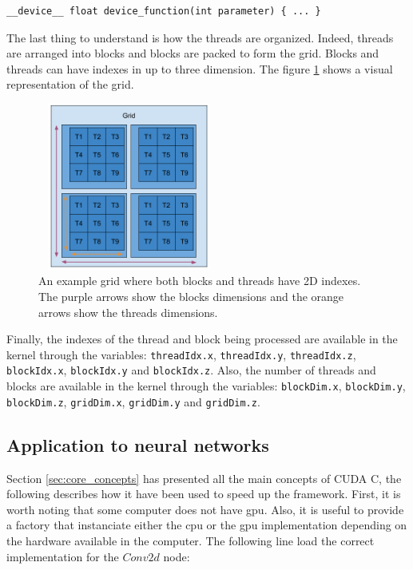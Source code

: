 \documentclass[11pt]{report}
\begin{document}
\begin{verbatim}
__device__ float device_function(int parameter) { ... }
\end{verbatim}

\noindent The last thing to understand is how the threads are organized. Indeed, threads are arranged into blocks and blocks are packed to form the grid. Blocks and threads can have indexes in up to three dimension. The figure \ref{fig:grid} shows a visual representation of the grid.
\\

\begin{figure}[h]
\centering
\includegraphics[width=6cm, height=5.5cm]{grid}
\caption[Illustration of the GPU grid]{An example grid where both blocks and threads have 2D indexes. The purple arrows show the blocks dimensions and the orange arrows show the threads dimensions.}
\label{fig:grid}
\end{figure}

\noindent Finally, the indexes of the thread and block being processed are available in the kernel through the variables: \texttt{threadIdx.x}, \texttt{threadIdx.y}, \texttt{threadIdx.z}, \texttt{blockIdx.x}, \texttt{blockIdx.y} and \texttt{blockIdx.z}. Also, the number of threads and blocks are available in the kernel through the variables: \texttt{blockDim.x}, \texttt{blockDim.y}, \texttt{blockDim.z}, \texttt{gridDim.x}, \texttt{gridDim.y} and \texttt{gridDim.z}.

\subsection{Application to neural networks}

Section \ref{sec:core_concepts} has presented all the main concepts of CUDA C, the following describes how it have been used to speed up the framework. First, it is worth noting that some computer does not have \acrshort{gpu}. Also, it is useful to provide a factory that instanciate either the \acrshort{cpu} or the \acrshort{gpu} implementation depending on the hardware available in the computer. The following line load the correct implementation for the $Conv2d$ node:
\end{document}
